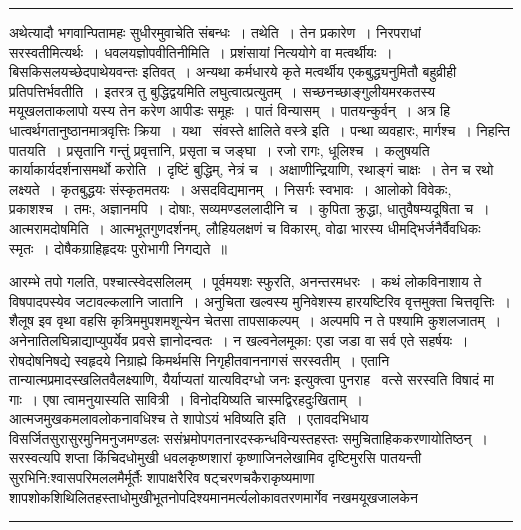 \documentclass[11pt, openany]{book}
\begin{document}
\vspace{2mm}
\hrule

{\s अथेत्यादौ भगवान्पितामहः सुधीरमुवाचेति संबन्धः~। {\qtt तथेति}~। तेन प्रकारेण~। निरपराधां सरस्वतीमित्यर्थः~। {\qtt धवलयज्ञोपवीतिनीमिति}~। प्रशंसायां नित्ययोगे वा मत्वर्थीयः~। {\qt बिसकिसलयच्छेदपाथेयवन्तः} इतिवत्~। अन्यथा कर्मधारये कृते मत्वर्थीय एकबुद्ध्यनुमितौ बहुव्रीही प्रतिपत्तिर्भवतीति~। इतरत्र तु बुद्धिद्वयमिति लघुत्वात्प्रत्युतम्~। सच्छनच्छाङ्गुलीयमरकतस्य मयूखलताकलापो यस्य तेन करेण आपीडः समूहः~। पातं विन्यासम्~। पातयन्कुर्वन्~। अत्र हि धात्वर्थगतानुष्ठानमात्रवृत्तिः क्रिया~। यथा \textendash\ {\qt संवस्ते क्षालिते वस्त्रे} इति~। पन्था व्यवहारः, मार्गश्च~। निहन्ति पातयति~। प्रसृतानि गन्तुं प्रवृत्तानि, प्रसृता च जङ्घा~। रजो रागः, धूलिश्च~। कलुषयति कार्याकार्यदर्शनासमर्थो करोति~। दृष्टिं बुद्धिम्, नेत्रं च~। अक्षाणीन्द्रियाणि, रथाङ्गं चाक्षः~। तेन च रथो लक्ष्यते~। कृतबुद्धयः संस्कृतमतयः~। {\qtt असदविद्यमानम्}~। निसर्गः स्वभावः~। आलोको विवेकः, प्रकाशश्च~। तमः, अज्ञानमपि~। दोषाः, सव्यमण्डललादीनि च~। कुपिता क्रुद्धा, धातुवैषम्यदूषिता च~। आत्मरामदोषमिति~। आत्मभूतगुणदर्शनम्, लौहियलक्षणं च विकारम्, {\qt वोढा भारस्य धीमद्भिर्जनैर्वैवधिकः स्मृतः~। दोषैकग्राहिहृदयः पुरोभागी निगद्यते~॥}}

\newpage

\noindent
आरम्भे तपो गलति, पश्चात्स्वेदसलिलम्~। पूर्वमयशः स्फुरति, अनन्तरमधरः~। कथं लोकविनाशाय ते विषपादपस्येव जटावल्कलानि जातानि~। अनुचिता खल्वस्य मुनिवेशस्य हारयष्टिरिव वृत्तमुक्ता चित्तवृत्तिः~। शैलूष इव वृथा वहसि कृत्रिममुपशमशून्येन चेतसा तापसाकल्पम्~। अल्पमपि न ते पश्यामि कुशलजातम्~। अनेनातिलघिन्नाद्याप्युपर्येव प्रवसे ज्ञानोदन्वतः~। न खल्वनेलमूका: एडा जडा वा सर्व एते सहर्षयः~। रोषदोषनिषद्ये स्वहृदये निग्राह्ये किमर्थमसि निगृहीतवाननागसं सरस्वतीम्~। एतानि तान्यात्मप्रमादस्खलितवैलक्ष्याणि, यैर्याप्यतां यात्यविदग्धो जनः इत्युक्त्वा पुनराह \textendash\ {\haq वत्से सरस्वति विषादं मा गाः~। एषा त्वामनुयास्यति सावित्री~। विनोदयिष्यति चास्मद्विरहदुःखिताम्~। आत्मजमुखकमलावलोकनावधिश्च ते शापोऽयं भविष्यति} इति~। एतावदभिधाय विसर्जितसुरासुरमुनिमनुजमण्डलः ससंभ्रमोपगतनारदस्कन्धविन्यस्तहस्तः समुचिताहिककरणायोतिष्ठन्~। सरस्वत्यपि शप्ता किंचिदधोमुखी धवलकृष्णशारां कृष्णाजिनलेखामिव दृष्टिमुरसि पातयन्ती सुरभिनि:श्वासपरिमललमैर्मूर्तैः शापाक्षरैरिव षट्चरणचकैराकृष्यमाणा शापशोकशिथिलितहस्ताधोमुखीभूतनोपदिश्यमानमर्त्यलोकावतरणमार्गेव नखमयूखजालकेन

\vspace{2mm}
\hrule
\end{document}

